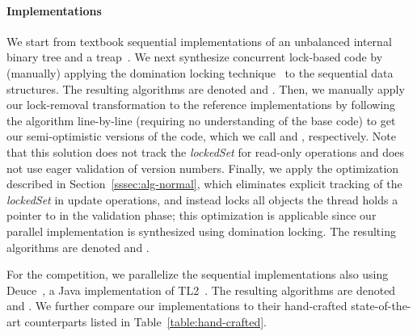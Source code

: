 
\paragraph{Implementations}
We start from textbook sequential implementations of an unbalanced internal binary
tree and a treap~\cite{AragonS1989}. We next  synthesize 
concurrent lock-based code by (manually) applying the domination locking technique~\cite{Gueta2011} to the sequential
data structures. The resulting algorithms are denoted \domTree and \domTreap.
Then, we manually apply our lock-removal transformation to the reference
implementations by following the algorithm line-by-line (requiring no understanding of the base code)
to get our semi-optimistic versions of the code, which we call
\autoTree and \autoTreap, respectively. Note that this solution does not track the  \emph{lockedSet} for read-only operations and does not use eager validation of version numbers.
Finally, we apply the optimization described in Section~\ref{sssec:alg-normal}, which eliminates explicit tracking of the \emph{lockedSet} in update operations,
and instead locks 
all objects the thread holds a pointer to in the validation phase; this optimization is applicable since our parallel implementation is synthesized using
domination locking. The resulting algorithms are denoted \optAutoTree and \optAutoTreap.   

For the competition, we parallelize the sequential implementations also using 
Deuce~\cite{Deuce2010}, a Java implementation of  TL2~\cite{DiceSS2006}. The resulting algorithms are denoted \stmTree and \stmTreap. We further compare our implementations to their hand-crafted state-of-the-art counterparts
listed in Table~\ref{table:hand-crafted}.


